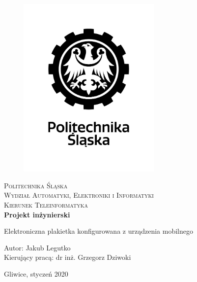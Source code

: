 \documentclass[a4paper,12pt, twoside]{article}
\begin{document}
    	\newpage
    	\thispagestyle{empty}
    	\begin{center}
    		
    		\begin{figure}
    			\centering
    			\includegraphics[width=7cm]{images/polsl_logo.jpg}
    			\vspace{.5cm}
    		\end{figure}
    		
    		{\fontsize{17}{17}\selectfont
    			\textsc{Politechnika Śląska \\[.3cm]
    				Wydział Automatyki, Elektroniki i Informatyki  \\[.3cm]
    				Kierunek Teleinformatyka  \\[1.5cm]}
    			\textbf{Projekt inżynierski \\[0.7cm]}}
    		
    		\Large
    		{Elektroniczna plakietka konfigurowana z urządzenia mobilnego \\[3.5cm]}
    		\Large{\begin{flushleft}
    				Autor: Jakub Legutko\\
    				Kierujący pracą: dr inż. Grzegorz Dziwoki\\[0.3cm]
    		\end{flushleft}}
    		
    		\normalsize
    		\vfill Gliwice, styczeń 2020
    	\end{center}
    	\newpage
    	\leavevmode\thispagestyle{empty}\newpage
    	\newpage
    	\thispagestyle{empty}
    	\tableofcontents
    	\newpage
    	\leavevmode\thispagestyle{empty}\newpage
    	\newpage
    	\clearpage
    	\setcounter{page}{1}
    	
\end{document}
